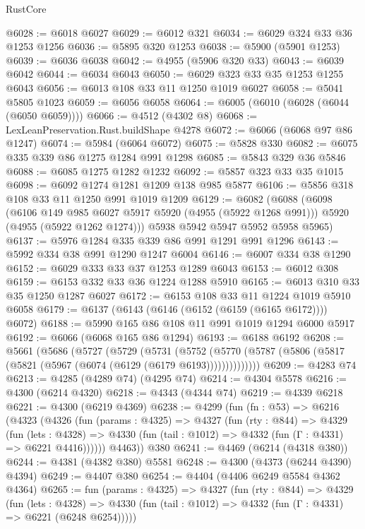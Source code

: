 \begin{lexlean}{RustCore}
\begin{coremodule}
@6028 := @6018 @6027
@6029 := @6012 @321
@6034 := @6029 @324 @33 @36 @1253 @1256
@6036 := @5895 @320 @1253
@6038 := @5900 (@5901 @1253)
@6039 := @6036 @6038
@6042 := @4955 (@5906 @320 @33)
@6043 := @6039 @6042
@6044 := @6034 @6043
@6050 := @6029 @323 @33 @35 @1253 @1255 @6043
@6056 := @6013 @108 @33 @11 @1250 @1019 @6027
@6058 := @5041 @5805 @1023
@6059 := @6056 @6058
@6064 := @6005 (@6010 (@6028 (@6044 (@6050 @6059))))
@6066 := @4512 (@4302 @8)
@6068 := LexLeanPreservation.Rust.buildShape @4278
@6072 := @6066 (@6068 @97 @86 @1247)
@6074 := @5984 (@6064 @6072)
@6075 := @5828 @330
@6082 := @6075 @335 @339 @86 @1275 @1284 @991 @1298
@6085 := @5843 @329 @36 @5846
@6088 := @6085 @1275 @1282 @1232
@6092 := @5857 @323 @33 @35 @1015
@6098 := @6092 @1274 @1281 @1209 @138 @985 @5877
@6106 := @5856 @318 @108 @33 @11 @1250 @991 @1019 @1209
@6129 := @6082
    (@6088
      (@6098
        (@6106 @149 @985 @6027 @5917 @5920 (@4955 (@5922 @1268 @991)))
        @5920
        (@4955 (@5922 @1262 @1274)))
      @5938
      @5942
      @5947
      @5952
      @5958
      @5965)
@6137 := @5976 @1284 @335 @339 @86 @991 @1291 @991 @1296
@6143 := @5992 @334 @38 @991 @1290 @1247 @6004
@6146 := @6007 @334 @38 @1290
@6152 := @6029 @333 @33 @37 @1253 @1289 @6043
@6153 := @6012 @308
@6159 := @6153 @332 @33 @36 @1224 @1288 @5910
@6165 := @6013 @310 @33 @35 @1250 @1287 @6027
@6172 := @6153 @108 @33 @11 @1224 @1019 @5910 @6058
@6179 := @6137 (@6143 (@6146 (@6152 (@6159 (@6165 @6172)))) @6072)
@6188 := @5990 @165 @86 @108 @11 @991 @1019 @1294 @6000 @5917
@6192 := @6066 (@6068 @165 @86 @1294)
@6193 := @6188 @6192
@6208 := @5661
    (@5686
      (@5727
        (@5729
          (@5731
            (@5752
              (@5770 (@5787 (@5806 (@5817 (@5821 (@5967 (@6074 (@6129 (@6179 @6193))))))))))))))
@6209 := @4283 @74
@6213 := @4285 (@4289 @74) (@4295 @74)
@6214 := @4304 @5578
@6216 := @4300 (@6214 @4320)
@6218 := @4343 (@4344 @74)
@6219 := @4339 @6218
@6221 := @4300 (@6219 @4369)
@6238 := @4299
    (fun (fn : @53) =>
    @6216
      (@4323
        (@4326
          (fun (params : @4325) =>
          @4327
            (fun (rty : @844) =>
            @4329
              (fun (lets : @4328) =>
              @4330 (fun (tail : @1012) => @4332 (fun (Γ : @4331) => @6221 @4416))))))
        @4463))
    @380
@6241 := @4469 (@6214 (@4318 @380))
@6244 := @4381 (@4382 @380) @5581
@6248 := @4300 (@4373 (@6244 @4390) @4394)
@6249 := @4407 @380
@6254 := @4404 (@4406 @6249 @5584 @4362 @4364)
@6265 := fun (params : @4325) =>
  @4327
    (fun (rty : @844) =>
    @4329
      (fun (lets : @4328) =>
      @4330 (fun (tail : @1012) => @4332 (fun (Γ : @4331) => @6221 (@6248 @6254)))))

\end{coremodule}
\end{lexlean}
